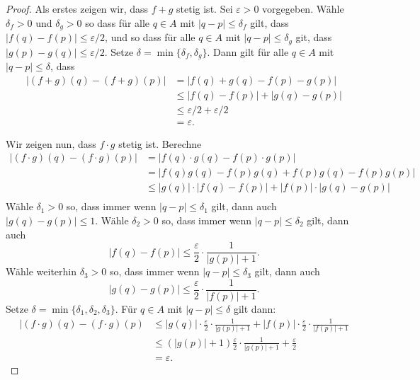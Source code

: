 \documentclass[../main.tex]{subfiles}
\begin{document}
\begin{proof}
  Als erstes zeigen wir,
  dass $f  + g$ stetig ist.
  Sei $\varepsilon > 0$ vorgegeben.
  Wähle $\delta_f > 0$ und  $\delta_g > 0$ 
  so dass für alle $q \in A$ mit
  $|q - p| \leq \delta_f$ gilt, dass
  $|f(q) - f(p)| \leq \varepsilon/2$,
  und so dass für alle
  $q \in A$ mit $|q - p| \leq \delta_g$ 
  git, dass
  $|g(p) - g(q)| \leq \varepsilon/2$.
  Setze $\delta = \min \{\delta_f, \delta_g\}$.
  Dann gilt für alle $q \in A$ mit
  $|q - p| \leq \delta$, dass
  \begin{align*}
  |(f + g)(q) - (f + g)(p)| &     = |f(q) + g(q) - f(p) - g(p)|\\
                            & \leq |f(q) - f(p)| + |g(q) - g(p)|\\
                            & \leq \varepsilon/2 + \varepsilon/2\\
                            &= \varepsilon.
  \end{align*}

  Wir zeigen nun, dass $f \cdot g$ stetig ist.
  Berechne
  \begin{align*}
     |(f\cdot g)(q) - (f \cdot g)(p)|
     & = |f(q) \cdot g(q) - f(p) \cdot g(p)| \\
     & = |f(q)g(q) - f(p)g(q) + f(p)g(q) - f(p) g(p)| \\
     & \leq |g(q)| \cdot |f(q) - f(p)| + 
     |f(p)| \cdot |g(q) - g(p)| \\
  \end{align*}
  Wähle $\delta_1 > 0$ so, dass immer wenn
  $|q - p| \leq \delta_1$ gilt, dann auch
  $|g(q) - g(p)| \leq 1$. Wähle
  $\delta_2 > 0$ so, dass immer
  wenn $|q - p| \leq \delta_2$ gilt, dann auch
  \[
    |f(q) - f(p)| \leq \frac{\varepsilon}{2} \cdot
    \frac{1}{|g(p)| + 1}.
  \]
  Wähle weiterhin $\delta_3 > 0$ so, dass immer wenn
  $|q - p| \leq \delta_3$ gilt, dann auch
  \[
    |g(q) - g(p)| \leq \frac{\varepsilon}{2} \cdot
    \frac{1}{|f(p)| + 1}.
  \]
  Setze $\delta = \min \{\delta_1, \delta_2, \delta_3 \}$.
  Für $q \in A$ mit $|q - p| \leq \delta$ gilt dann:
  \begin{align*}
    |(f \cdot g)(q) - (f \cdot g)(p)
    &\leq |g(q)| \cdot \frac{\varepsilon}{2} \cdot  
    \frac{1}{|g(p)| + 1}
    + |f(p)| \cdot \frac{\varepsilon}{2}
    \cdot \frac{1}{|f(p)| + 1}\\
    & \leq (|g(p)| + 1) \frac{\varepsilon}{2}
    \cdot \frac{1}{|g(p)| + 1} + \frac{\varepsilon}{2}  \\
    &= \varepsilon.
  \end{align*}
  

\end{proof}
\end{document}
